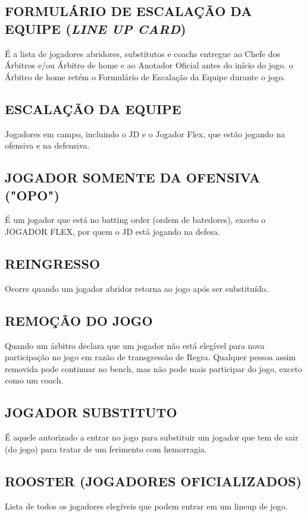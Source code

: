 \subsection{FORMULÁRIO DE ESCALAÇÃO DA EQUIPE (\textit{LINE UP CARD})}
 É a lista de jogadores abridores, substitutos e \glspl{coach} entregue ao Chefe dos Árbitros e/ou Árbitro de \gls{home} e ao Anotador Oficial antes do início do jogo. o Árbitro de \gls{home} retém o Formulário de Escalação da Equipe durante o jogo.

\subsection{ESCALAÇÃO DA EQUIPE}
 Jogadores em campo, incluindo o JD e o Jogador Flex, que estão jogando na ofensiva e na defensiva.

\subsection{JOGADOR SOMENTE DA OFENSIVA ("OPO")}
 É um jogador que está no \gls{batting order} (ordem de batedores), exceto o JOGADOR FLEX, por quem o JD está jogando na defesa.
\subsection{REINGRESSO}

Ocorre quando um jogador abridor retorna ao jogo após ser substituído.
\subsection{REMOÇÃO DO JOGO}

Quando um árbitro declara que um jogador não está elegível para nova  participação no jogo em razão de transgressão de Regra. Qualquer pessoa  assim removida pode continuar no \gls{bench}, mas não pode mais participar do jogo, exceto como um \gls{coach}.
\subsection{JOGADOR SUBSTITUTO}

É aquele autorizado a entrar no jogo para substituir um jogador que tem de sair (do jogo) para tratar de um ferimento com hemorragia.

\subsection{ROOSTER (JOGADORES OFICIALIZADOS)}
 Lista de todos os jogadores elegíveis que podem entrar em um \gls{lineup} de jogo.

